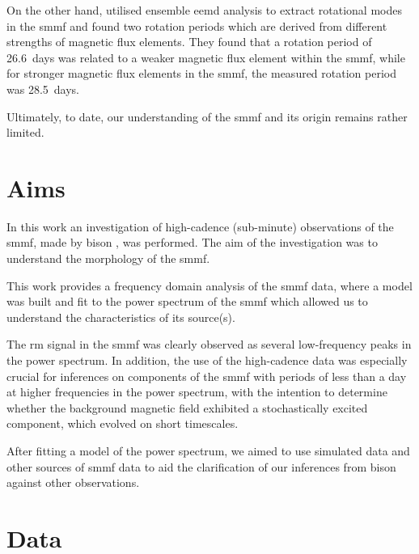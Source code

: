 On the other hand, \citet{xiang_ensemble_2016} utilised ensemble \gls{eemd} analysis to extract rotational modes in the \gls{smmf} and found two rotation periods which are derived from different strengths of magnetic flux elements. They found that a rotation period of 26.6~days was related to a weaker magnetic flux element within the \gls{smmf}, while for stronger magnetic flux elements in the \gls{smmf}, the measured rotation period was 28.5~days.

Ultimately, to date, our understanding of the \gls{smmf} and its origin remains rather limited.


\section{Aims}\label{sec:SMMF_aims}

In this work an investigation of high-cadence (sub-minute) observations of the \gls{smmf}, made by \gls{bison} \citep{chaplin_bison_1996, chaplin_noise_2005, hale_performance_2016}, was performed. The aim of the investigation was to understand the morphology of the \gls{smmf}. 

This work provides a frequency domain analysis of the \gls{smmf} data, where a model was built and fit to the power spectrum of the \gls{smmf} which allowed us to understand the characteristics of its source(s). 

The \gls{rm} signal in the \gls{smmf} was clearly observed as several low-frequency peaks in the power spectrum. In addition, the use of the high-cadence data was especially crucial for inferences on components of the \gls{smmf} with periods of less than a day at higher frequencies in the power spectrum, with the intention to determine whether the background magnetic field exhibited a stochastically excited component, which evolved on short timescales.

After fitting a model of the power spectrum, we aimed to use simulated data and other sources of \gls{smmf} data to aid the clarification of our inferences from \gls{bison} against other observations.



\section{Data}\label{sec:SMMF_data}


